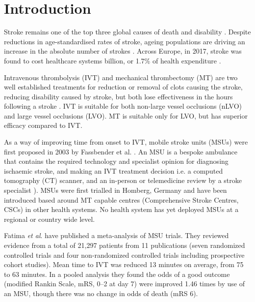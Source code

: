 \section{Introduction}


Stroke remains one of the top three global causes of death and disability \cite{feigin_global_2021}. Despite reductions in age-standardised rates of stroke, ageing populations are driving an increase in the absolute number of strokes \cite{feigin_global_2021}. Across Europe, in 2017, stroke was found to cost healthcare systems  billion, or 1.7\% of health expenditure \cite{luengo-fernandez_economic_2020}.

Intravenous thrombolysis (IVT) and mechanical thrombectomy (MT) are two well established treatments for reduction or removal of clots causing the stroke, reducing disability caused by stroke, but both lose effectiveness in the hours following a stroke \cite{emberson_effect_2014, fransen_time_2016}. IVT is suitable for both non-large vessel occlusions (nLVO) and large vessel occlusions (LVO). MT is suitable only for LVO, but has superior efficacy compared to IVT.


As a way of improving time from onset to IVT, mobile stroke units (MSUs) were first proposed in 2003 by Fassbender et al. \cite{fassbender_mobile_2003}. An MSU is a bespoke ambulance that contains the required technology and specialist opinion for diagnosing ischaemic stroke, and making an IVT treatment decision i.e. a computed tomography (CT) scanner, and an in-person or telemedicine review by a stroke specialist \cite{taqui_reduction_2017}). MSUs were first trialled in Homberg, Germany \cite{walter_diagnosis_2012} and have been introduced based around MT capable centres (Comprehensive Stroke Centres, CSCs)  in other health systems. No health system has yet deployed MSUs at a regional or country wide level.

Fatima \textit{et al}. \cite{fatima_mobile_2020} have published a meta-analysis of MSU trials. They reviewed evidence from a total of 21,297 patients from 11 publications (seven randomized controlled trials and four non-randomized controlled trials including prospective cohort studies). Mean time to IVT was reduced 13 minutes on average, from 75 to 63 minutes. In a pooled analysis they found the odds of a good outcome (modified Rankin Scale, mRS, 0–2 at day 7) were improved 1.46 times by use of an MSU, though there was no change in odds of death (mRS 6).

